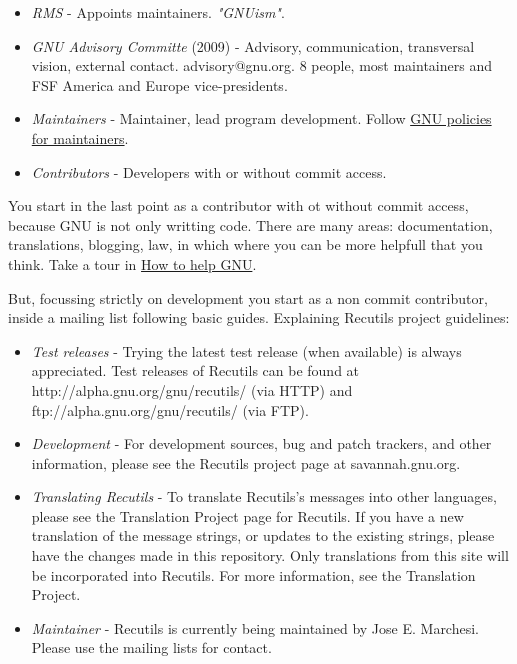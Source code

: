 \begin{itemize}
	\item \textit{RMS} - Appoints maintainers. \textit{"GNUism"}.
	\item \textit{GNU Advisory Committe} (2009) - Advisory, communication, transversal vision, external contact. advisory@gnu.org. 8 people, most maintainers and FSF America and Europe vice-presidents.
	\item \textit{Maintainers} - Maintainer, lead program development. Follow \href{http://www.gnu.org/prep/maintain_toc.html}{GNU policies for maintainers}.
	\item \textit{Contributors} - Developers with or without commit access.
\end{itemize} You start in the last point as a contributor with ot without commit access, because GNU is not only writting code. There are many areas: documentation, translations, blogging, law, in which where you can be more helpfull that you think. Take a tour in \href{http://www.gnu.org/help/}{How to help GNU}.

\par But, focussing strictly on development you start as a non commit contributor, inside a mailing list following basic guides. Explaining Recutils project guidelines:

\begin{itemize}
	\item \textit{Test releases} - Trying the latest test release (when available) is always appreciated. Test releases of Recutils can be found at http://alpha.gnu.org/gnu/recutils/ (via HTTP) and ftp://alpha.gnu.org/gnu/recutils/ (via FTP).
	\item \textit{Development} - For development sources, bug and patch trackers, and other information, please see the Recutils project page at savannah.gnu.org.
	\item \textit{Translating Recutils} - To translate Recutils's messages into other languages, please see the Translation Project page for Recutils. If you have a new translation of the message strings, or updates to the existing strings, please have the changes made in this repository. Only translations from this site will be incorporated into Recutils. For more information, see the Translation Project.
	\item \textit{Maintainer} - Recutils is currently being maintained by Jose E. Marchesi. Please use the mailing lists for contact.
\end{itemize}

